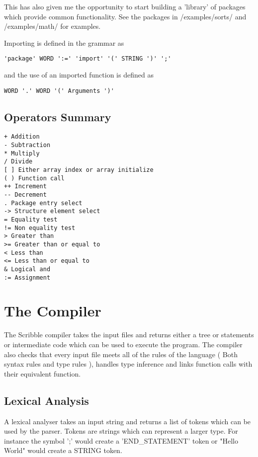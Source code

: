 \documentclass[]{final_report}
\begin{document}
This has also given me the opportunity to start building a 'library' of packages which provide common functionality. See the packages in /examples/sorts/ and /examples/math/ for examples.

Importing is defined in the grammar as 

\begin{verbatim}
'package' WORD ':=' 'import' '(' STRING ')' ';'
\end{verbatim}

and the use of an imported function is defined as

\begin{verbatim}
WORD '.' WORD '(' Arguments ')'
\end{verbatim}

\section{Operators Summary}

\begin {verbatim}
+ Addition
- Subtraction
* Multiply
/ Divide
[ ] Either array index or array initialize
( ) Function call
++ Increment
-- Decrement
. Package entry select
-> Structure element select
= Equality test
!= Non equality test
> Greater than
>= Greater than or equal to
< Less than
<= Less than or equal to
& Logical and 
:= Assignment
\end{verbatim}

\chapter{The Compiler}

The Scribble compiler takes the input files and returns either a tree or statements or intermediate code which can be used to execute the program. The compiler also checks that every input file meets all of the rules of the language ( Both syntax rules and type rules ), handles type inference and links function calls with their equivalent function.

\section{Lexical Analysis}

A lexical analyser takes an input string and returns a list of tokens which can be used by the parser. Tokens are strings which can represent a larger type. For instance the symbol ';' would create a 'END\_STATEMENT' token or "Hello World" would create a STRING token.
\end{document}
